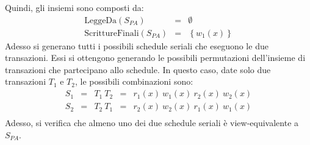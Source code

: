 \documentclass[a4paper]{article}
\begin{document}
	\noindent
	Quindi, gli insiemi sono composti da:
	\begin{equation*}
		\begin{array}{rll}
			\text{LeggeDa}\left(S_{PA}\right) &=& \emptyset \\
			\text{ScrittureFinali}\left(S_{PA}\right) &=& \left\{w_{1}\left(x\right)\right\}
		\end{array}
	\end{equation*}
	Adesso si generano tutti i possibili schedule seriali che eseguono le due transazioni. Essi si ottengono generando le possibili permutazioni dell'insieme di transazioni che partecipano allo schedule. In questo caso, date solo due transazioni $T_{1}$ e $T_{2}$, le possibili combinazioni sono:
	\begin{equation*}
		\begin{array}{lllll}
			S_{1} &=& T_{1} \: T_{2} &=& r_{1}\left(x\right) \: w_{1}\left(x\right) \: r_{2}\left(x\right) \: w_{2}\left(x\right) \\
			S_{2} &=& T_{2} \: T_{1} &=& r_{2}\left(x\right) \: w_{2}\left(x\right) \: r_{1}\left(x\right) \: w_{1}\left(x\right) \\
		\end{array}
	\end{equation*}
	Adesso, si verifica che almeno uno dei due schedule seriali è view-equivalente a $S_{PA}$.\newpage
	
\end{document}
